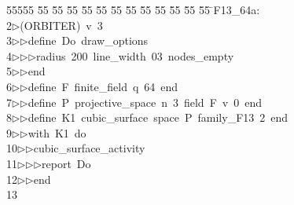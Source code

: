 %
%
\begin{tabbing}
55555 \= 55 \= 55 \= 55 \= 55 \= 55 \= 55 \= 55 \= 55 \= 55 \= 55 \= 55 \= 55 \= \>F13\_64a:\\[0pt]
2\>$\triangleright$\>(ORBITER)\ v\ 3\ \\[0pt]
3\>$\triangleright$\>$\triangleright$\>define\ Do\ draw\_options\ \\[0pt]
4\>$\triangleright$\>$\triangleright$\>$\triangleright$\>radius\ 200\ line\_width\ 03\ nodes\_empty\ \\[0pt]
5\>$\triangleright$\>$\triangleright$\>end\ \\[0pt]
6\>$\triangleright$\>$\triangleright$\>define\ F\ finite\_field\ q\ 64\ end\ \\[0pt]
7\>$\triangleright$\>$\triangleright$\>define\ P\ projective\_space\ n\ 3\ field\ F\ v\ 0\ end\ \\[0pt]
8\>$\triangleright$\>$\triangleright$\>define\ K1\ cubic\_surface\ space\ P\ family\_F13\ 2\ end\ \\[0pt]
9\>$\triangleright$\>$\triangleright$\>with\ K1\ do\ \\[0pt]
10\>$\triangleright$\>$\triangleright$\>cubic\_surface\_activity\ \\[0pt]
11\>$\triangleright$\>$\triangleright$\>$\triangleright$\>report\ Do\ \\[0pt]
12\>$\triangleright$\>$\triangleright$\>end\\[0pt]
13\>\end{tabbing}
